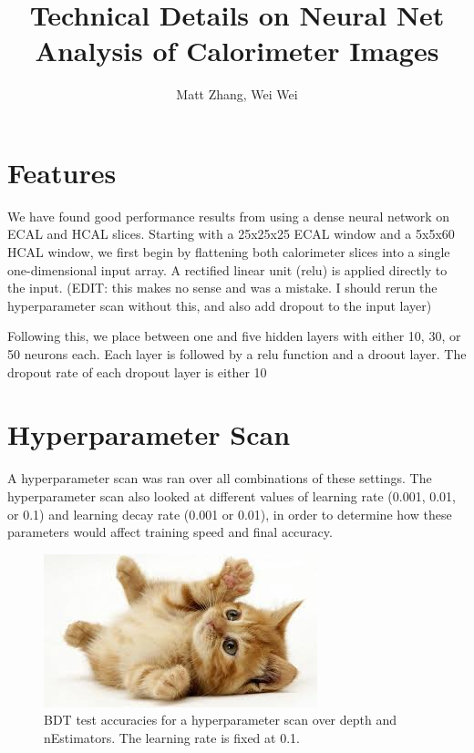 \documentclass{article}
\begin{document}
    \title{Technical Details on Neural Net Analysis of Calorimeter Images}
    \author{Matt Zhang, Wei Wei}
    \date{}
    \maketitle

    \section*{Features}

    We have found good performance results from using a dense neural network on ECAL and HCAL slices. Starting with a 25x25x25 ECAL window and a 5x5x60 HCAL window, we first begin by flattening both calorimeter slices into a single one-dimensional input array. A rectified linear unit (relu) is applied directly to the input. (EDIT: this makes no sense and was a mistake. I should rerun the hyperparameter scan without this, and also add dropout to the input layer)

    Following this, we place between one and five hidden layers with either 10, 30, or 50 neurons each. Each layer is followed by a relu function and a droout layer. The dropout rate of each dropout layer is either 10%

    \section*{Hyperparameter Scan}

    A hyperparameter scan was ran over all combinations of these settings. The hyperparameter scan also looked at different values of learning rate (0.001, 0.01, or 0.1) and learning decay rate (0.001 or 0.01), in order to determine how these parameters would affect training speed and final accuracy.

    \begin{figure}
        \begin{center}
            \includegraphics{images/cat-thumb.jpeg}
        \end{center}
        \caption{BDT test accuracies for a hyperparameter scan over depth and nEstimators. The learning rate is fixed at 0.1.}
        \label{BDTscan1}
    \end{figure}
\end{document}
